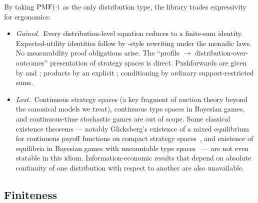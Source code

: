 By taking $\mathrm{PMF}(\cdot)$ as the only distribution type, the library
trades expressivity for ergonomics:
\begin{itemize}
\item \emph{Gained.}\ Every distribution-level equation reduces to
a finite-sum identity.  Expected-utility identities follow by
-style rewriting under the monadic laws.  No
measurability proof obligations arise.  The ``profile $\to$
distribution-over-outcomes'' presentation of strategy spaces is
direct.  Pushforwards are given by  and
; products by an explicit ; conditioning by
ordinary support-restricted sums.

\item \emph{Lost.}\ Continuous strategy spaces (a key fragment of
auction theory beyond the canonical models we treat), continuous
type spaces in Bayesian games, and continuous-time stochastic
games are out of scope.  Some classical existence theorems —
notably Glicksberg's existence of a mixed equilibrium for
continuous payoff functions on compact strategy
spaces~\citep{Glicksberg1952}, and existence of equilibria in
Bayesian games with uncountable type spaces~\citep{MilgromWeber1985}
— are not even statable in this idiom.  Information-economic
results that depend on absolute continuity of one
distribution with respect to another are also unavailable.
\end{itemize}


\subsection{Finiteness}
\label{sec:prelim:finite}

